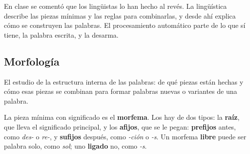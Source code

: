 \documentclass[11pt,letterpaper]{article}
\begin{document}
\begin{center}
\end{center}

En clase se comentó que los lingüistas lo han hecho al revés. La
lingüística describe las piezas mínimas y las reglas para combinarlas,
y desde ahí explica cómo se construyen las palabras. El procesamiento
automático parte de lo que sí tiene, la palabra escrita, y la
desarma.


\subsection*{Morfología}

\begin{definicion}[Morfología]
    El estudio de la estructura interna de las palabras: de qué piezas
    están hechas y cómo esas piezas se combinan para formar palabras
    nuevas o variantes de una palabra.
\end{definicion}

La pieza mínima con significado es el \textbf{morfema}. Los hay de dos
tipos: la \textbf{raíz}, que lleva el significado principal, y los
\textbf{afijos}, que se le pegan: \textbf{prefijos} antes, como
\textit{des-} o \textit{re-}, y \textbf{sufijos} después, como
\textit{-ción} o \textit{-s}. Un morfema \textbf{libre} puede ser
palabra solo, como \textit{sol}; uno \textbf{ligado} no, como
\textit{-s}.
\end{document}
